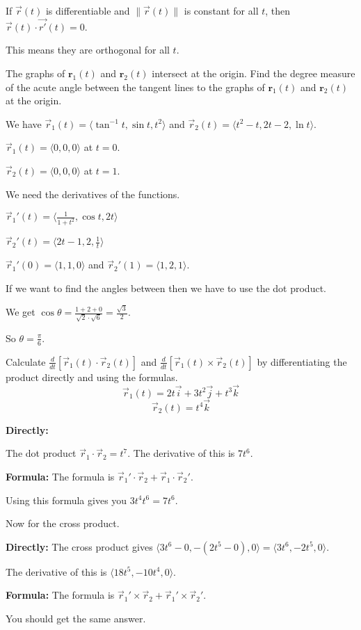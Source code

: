 \documentclass[../calc3.tex]{subfiles}
\begin{document}
\begin{theorem}
    If $\vec{r}(t)$ is differentiable and $\|\vec{r}(t)\|$ is constant for all $t$, then $\vec{r}(t)\cdot \vec{r'}(t)=0$.

    This means they are orthogonal for all $t$.
\end{theorem}

\begin{example}
    The graphs of $\textbf{r}_1(t)$ and $\textbf{r}_2(t)$ intersect at the origin. Find the degree measure of the acute angle between the tangent lines to the graphs of $\textbf{r}_1(t)$ and $\textbf{r}_2(t)$ at the origin.

    We have $\vec{r}_1(t)=\langle \tan^{-1}t, \sin t, t^2\rangle$ and $\vec{r}_2(t)=\langle t^2-t, 2t-2,\ln t\rangle$.

    $\vec{r}_1(t)=\langle 0,0,0\rangle$ at $t=0$.

    $\vec{r}_2(t)=\langle 0,0,0\rangle$ at $t=1$.

    We need the derivatives of the functions.

    $\vec{r}_1'(t)=\langle \frac{1}{1+t^2},\cos t, 2t\rangle$
    
    $\vec{r}_2'(t)=\langle 2t-1, 2,\frac{1}{t}\rangle$

    $\vec{r}_1'(0)=\langle 1,1,0\rangle$ and $\vec{r}_2'(1)=\langle 1,2,1\rangle$.

    If we want to find the angles between then we have to use the dot product.

    We get $\cos\theta = \frac{1+2+0}{\sqrt{2}\cdot \sqrt{6}} = \frac{\sqrt{3}}{2}$.

    So $\theta = \frac{\pi}{6}$.
\end{example}

\pagebreak
\begin{example}
    Calculate $\frac{d}{dt}\left[ \vec{r}_1(t)\cdot \vec{r}_2(t)\right]$ and $\frac{d}{dt}\left[\vec{r}_1(t)\times \vec{r}_2(t)\right]$ by differentiating the product directly and using the formulas.
    \[ \vec{r}_1(t)=2t\vec{i}+3t^2\vec{j}+t^3\vec{k} \]
    \[ \vec{r}_2(t)=t^4 \vec{k}\]

    \textbf{Directly:}

    The dot product $\vec{r}_1\cdot \vec{r}_2 = t^7$. The derivative of this is $7t^6$.


    \textbf{Formula:}
    The formula is $\vec{r}_1'\cdot \vec{r}_2+\vec{r}_1\cdot \vec{r}_2'$.

    Using this formula gives you $3t^4t^6 = 7t^6$.

    
    Now for the cross product.

    \textbf{Directly:}
    The cross product gives $\langle 3t^6-0, -(2t^5-0),0\rangle = \langle 3t^6, -2t^5,0\rangle$.

    The derivative of this is $\langle 18t^5, -10t^4,0\rangle$.

    \textbf{Formula:}
    The formula is $\vec{r}_1'\times \vec{r}_2 + \vec{r}_1' \times \vec{r}_2'$.

    You should get the same answer.
\end{example}
\end{document}
